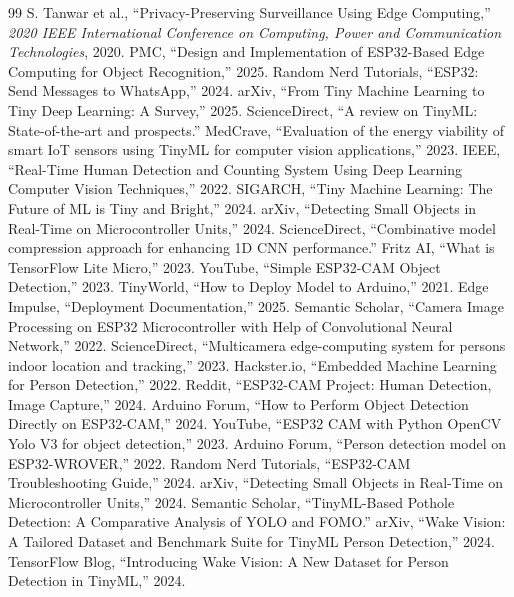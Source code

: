 \documentclass[12pt, a4paper]{article}
\begin{document}
\begin{thebibliography}{99}
 S. Tanwar et al., ``Privacy-Preserving Surveillance Using Edge Computing,'' \textit{2020 IEEE International Conference on Computing, Power and Communication Technologies}, 2020.
 PMC, ``Design and Implementation of ESP32-Based Edge Computing for Object Recognition,'' 2025.
 Random Nerd Tutorials, ``ESP32: Send Messages to WhatsApp,'' 2024.
 arXiv, ``From Tiny Machine Learning to Tiny Deep Learning: A Survey,'' 2025.
 ScienceDirect, ``A review on TinyML: State-of-the-art and prospects.''
 MedCrave, ``Evaluation of the energy viability of smart IoT sensors using TinyML for computer vision applications,'' 2023.
 IEEE, ``Real-Time Human Detection and Counting System Using Deep Learning Computer Vision Techniques,'' 2022.
 SIGARCH, ``Tiny Machine Learning: The Future of ML is Tiny and Bright,'' 2024.
 arXiv, ``Detecting Small Objects in Real-Time on Microcontroller Units,'' 2024.
 ScienceDirect, ``Combinative model compression approach for enhancing 1D CNN performance.''
 Fritz AI, ``What is TensorFlow Lite Micro,'' 2023.
 YouTube, ``Simple ESP32-CAM Object Detection,'' 2023.
 TinyWorld, ``How to Deploy Model to Arduino,'' 2021.
 Edge Impulse, ``Deployment Documentation,'' 2025.
 Semantic Scholar, ``Camera Image Processing on ESP32 Microcontroller with Help of Convolutional Neural Network,'' 2022.
 ScienceDirect, ``Multicamera edge-computing system for persons indoor location and tracking,'' 2023.
 Hackster.io, ``Embedded Machine Learning for Person Detection,'' 2022.
 Reddit, ``ESP32-CAM Project: Human Detection, Image Capture,'' 2024.
 Arduino Forum, ``How to Perform Object Detection Directly on ESP32-CAM,'' 2024.
 YouTube, ``ESP32 CAM with Python OpenCV Yolo V3 for object detection,'' 2023.
 Arduino Forum, ``Person detection model on ESP32-WROVER,'' 2022.
 Random Nerd Tutorials, ``ESP32-CAM Troubleshooting Guide,'' 2024.
 arXiv, ``Detecting Small Objects in Real-Time on Microcontroller Units,'' 2024.
 Semantic Scholar, ``TinyML-Based Pothole Detection: A Comparative Analysis of YOLO and FOMO.''
 arXiv, ``Wake Vision: A Tailored Dataset and Benchmark Suite for TinyML Person Detection,'' 2024.
 TensorFlow Blog, ``Introducing Wake Vision: A New Dataset for Person Detection in TinyML,'' 2024.

\end{thebibliography}
\end{document}
